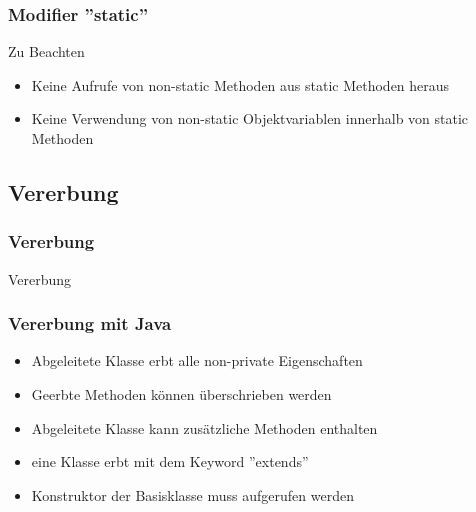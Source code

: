 \begin{frame}[fragile]
	  \frametitle{Modifier ''static''}
		 \begin{alertblock}{Zu Beachten}
			  \begin{itemize}
			  	\item Keine Aufrufe von non-static
			  	 Methoden aus static Methoden heraus
			  	\item Keine Verwendung von non-static
			  	 Objektvariablen innerhalb von static Methoden
			  \end{itemize}
		  \end{alertblock}
\end{frame}



\subsection{Vererbung} 
\begin{frame}[fragile]
	\frametitle{Vererbung}
	\huge Vererbung
\end{frame}

\begin{frame}[fragile]
	\frametitle{Vererbung mit Java}
		\begin{itemize}
		  \item Abgeleitete Klasse erbt
		  alle non-private Eigenschaften
		  \item Geerbte Methoden k\"onnen
		  \"uberschrieben werden
		  \item Abgeleitete Klasse kann
		  zus\"atzliche Methoden enthalten
		  \item eine Klasse erbt mit dem
		  Keyword ''extends''
		  \item Konstruktor der Basisklasse
		  muss aufgerufen werden
		\end{itemize}
\end{frame} 

